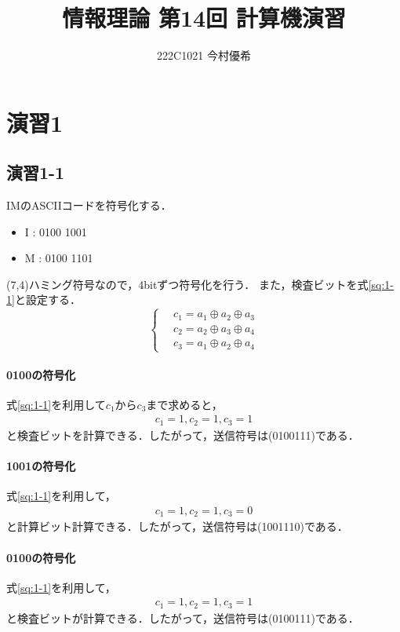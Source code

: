 \documentclass[documentclass]{jsarticle}
\begin{document}
\title{情報理論 第14回 計算機演習}
\author{222C1021 今村優希}
\maketitle

\newpage

\section*{演習1}
\subsection*{演習1-1}
IMのASCIIコードを符号化する．

\begin{itemize}
  \item I : 0100 1001
  \item M : 0100 1101
\end{itemize}

(7,4)ハミング符号なので，4bitずつ符号化を行う．
また，検査ビットを式\ref*{sq:1-1}と設定する．
\begin{equation}
  \left\{ \,
    \begin{aligned}
      &c_1 = a_1 \oplus a_2 \oplus a_3 \\
      &c_2 = a_2 \oplus a_3 \oplus a_4 \\
      &c_3 = a_1 \oplus a_2 \oplus a_4 
    \end{aligned}
  \right.
  \label{sq:1-1}
\end{equation}

\paragraph*{0100の符号化}
式\ref*{sq:1-1}を利用して$c_1$から$c_3$まで求めると，
\begin{align*}
  c_1 = 1, c_2 = 1, c_3 = 1
\end{align*}
と検査ビットを計算できる．したがって，送信符号は(0100111)である．

\paragraph*{1001の符号化}
式\ref*{sq:1-1}を利用して，
\begin{align*}
  c_1 = 1, c_2 = 1, c_3 = 0
\end{align*}
と計算ビット計算できる．したがって，送信符号は(1001110)である．

\paragraph*{0100の符号化}
式\ref*{sq:1-1}を利用して，
\begin{align*}
  c_1 = 1, c_2 = 1, c_3 = 1
\end{align*}
と検査ビットが計算できる．したがって，送信符号は(0100111)である．
\end{document}
